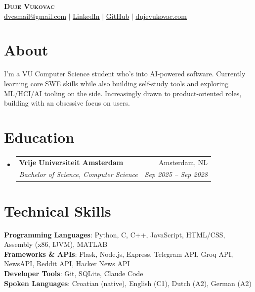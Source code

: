 \documentclass[a4paper,11pt]{article}
\makeatletter
\newcommand{\resumeSubheading}[4]{\vspace{-2pt}\item
  \begin{tabular*}{0.97\textwidth}[t]{l@{\extracolsep{\fill}}r}
    \textbf{#1} & #2 \\ \textit{\small#3} & \textit{\small #4} \\
  \end{tabular*}\vspace{-7pt}}
\newcommand{\resumeSubHeadingListStart}{\begin{itemize}[leftmargin=0.15in, label={}]}
\newcommand{\resumeSubHeadingListEnd}{\end{itemize}}
\makeatother
\begin{document}
\begin{center}
  \textbf{\Huge \scshape Duje Vukovac} \\ \vspace{1pt}
  \small \href{mailto:dvcsmail@gmail.com}{\underline{dvcsmail@gmail.com}} $|$
  \href{https://www.linkedin.com/in/dujevukovac}{\underline{LinkedIn}} $|$
  \href{https://github.com/duje-vuk}{\underline{GitHub}} $|$
  \href{https://dujevukovac.com}{\underline{dujevukovac.com}}
\end{center}

\section{About}
\begin{itemize}[leftmargin=0.15in, label={}, topsep=2pt]
  \small{\item{I'm a VU Computer Science student who's into AI-powered software. Currently learning core SWE skills while also building self-study tools and exploring ML/HCI/AI tooling on the side. Increasingly drawn to product-oriented roles, building with an obsessive focus on users.}}
\end{itemize}\vspace{-4pt}

\section{Education}
\resumeSubHeadingListStart
  \resumeSubheading{Vrije Universiteit Amsterdam}{Amsterdam, NL}{Bachelor of Science, Computer Science}{Sep 2025 -- Sep 2028}
\resumeSubHeadingListEnd

\section{Technical Skills}
\begin{itemize}[leftmargin=0.15in, label={}, topsep=2pt]
  \small{\item{
    \textbf{Programming Languages}{: Python, C, C++, JavaScript, HTML/CSS, Assembly (x86, IJVM), MATLAB} \\
    \textbf{Frameworks \& APIs}{: Flask, Node.js, Express, Telegram API, Groq API, NewsAPI, Reddit API, Hacker News API} \\
    \textbf{Developer Tools}{: Git, SQLite, Claude Code} \\
    \textbf{Spoken Languages}{: Croatian (native), English (C1), Dutch (A2), German (A2)}
  }}
\end{itemize}
\end{document}
